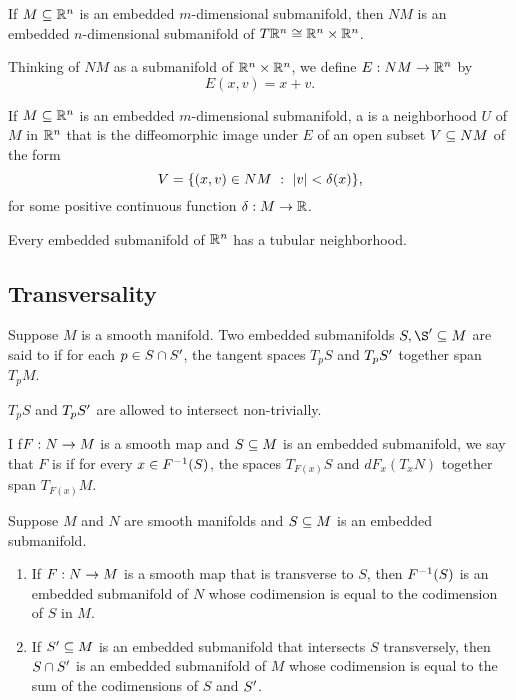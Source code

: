 \setcounter{thm}{22}

\begin{thm}
If $M\subseteq \mathbb{R}^n$ is an embedded $m$-dimensional submanifold, then $NM$ is an embedded $n$-dimensional submanifold of $T\mathbb{R}^n \cong \mathbb{R}^n\times\mathbb{R}^n$.
\end{thm}

\dfn Thinking of $NM$ as a submanifold of $\mathbb{R}^n\times\mathbb{R}^n$, we define $E:NM\rightarrow \mathbb{R}^n$ by
\[E(x,v) = x + v.\]

\dfn If $M\subseteq \mathbb{R}^n$ is an embedded $m$-dimensional submanifold, a  is a neighborhood $U$ of $M$ in $\mathbb{R}^n$ that is the diffeomorphic image under $E$ of an open subset $V\subseteq NM$ of the form 
\[V = \{(x, v)\in NM\ :\ |v| < \delta(x)\},\]
for some positive continuous function $\delta:M\rightarrow \mathbb{R}$.

\begin{thm}
Every embedded submanifold of $\mathbb{R}^n$ has a tubular neighborhood.
\end{thm}

\subsection{Transversality}\nl

\dfn Suppose $M$ is a smooth manifold. Two embedded submanifolds $S,\S\p\seq M$ are said to  if for each $p\in S\cap S^\prime$, the tangent spaces $T_pS$ and $T_pS^\prime$ together span $T_pM$.

\nb $T_pS$ and $T_pS^\prime$ are allowed to intersect non-trivially.

\dfn I f$F:N\rightarrow M$ is a smooth map and $S\subseteq M$ is an embedded submanifold, we say that $F$ is  if for every $x\in F^{-1}(S)$, the spaces $T_{F(x)}S$ and $dF_x(T_xN)$ together span $T_{F(x)}M$.

\setcounter{thm}{29}

\begin{thm}
Suppose $M$ and $N$ are smooth manifolds and $S\subseteq M$ is an embedded submanifold.
\begin{enumerate}
    \item If $F:N\rightarrow M$ is a smooth map that is transverse to $S$, then $F^{-1}(S)$ is an embedded submanifold of $N$ whose codimension is equal to the codimension of $S$ in $M$.
    \item If $S^\prime\subseteq M$ is an embedded submanifold that intersects $S$ transversely, then $S\cap S^\prime$ is an embedded submanifold of $M$ whose codimension is equal to the sum of the codimensions of $S$ and $S^\prime$.
\end{enumerate}
\end{thm}



